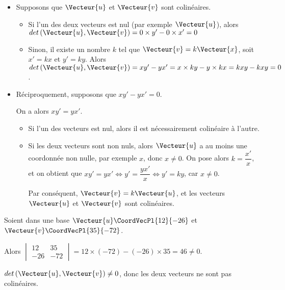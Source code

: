 \documentclass[a4paper]{article}
\begin{document}
\begin{demonstrationp}{}{}
  \begin{itemize}
    \item Supposons que $\Vecteur{u}$ et $\Vecteur{v}$ sont colinéaires.
    \begin{itemize}
      \item Si l'un des deux vecteurs est nul (par exemple $\Vecteur{u}$), alors $det\left(\Vecteur{u},\Vecteur{v}\right)=0\times y'-0 \times x'=0$
      \item Sinon, il existe un nombre $k$ tel que $\Vecteur{v}=k\Vecteur{x}$, soit $x'=kx$ et $y'=ky$. Alors $det\left(\Vecteur{u},\Vecteur{v}\right)=xy'-yx'=x\times ky-y\times kx=kxy-kxy=0$.
    \end{itemize}

    \item Réciproquement, supposons que $xy'-yx'=0$.
    
    On a alors $xy'=yx'$. 
    \begin{itemize}
      \item Si l'un des vecteurs est nul, alors il est nécessairement colinéaire à l'autre.
      \item Si les deux vecteurs sont non nuls, alors $\Vecteur{u}$ a au moins une coordonnée non nulle, par exemple $x$, donc $x\neq0$.
        On pose alors $k=\dfrac{x'}{x}$, et on obtient que $xy'=yx' \iff y'=\dfrac{yx'}{x} \iff y'=ky$, car $x\neq 0$.

        Par conséquent, $\Vecteur{v}=k\Vecteur{u}$, et les vecteurs $\Vecteur{u}$ et $\Vecteur{v}$ sont colinéaires.
    \end{itemize}
  \end{itemize}

\end{demonstrationp}

\begin{example}{}{}

  Soient dans une base $\Vecteur{u}\CoordVecPl{12}{-26}$ et $\Vecteur{v}\CoordVecPl{35}{-72}$.

  Alors $\begin{vmatrix} 
    12 & 35 \\ 
    -26 & -72 
    \end{vmatrix} = 12\times(-72)-(-26)\times 35=46\neq 0$.

    $det\left(\Vecteur{u},\Vecteur{v}\right)\neq 0$,
      donc les deux vecteurs ne sont pas colinéaires.
\end{example}
\end{document}

